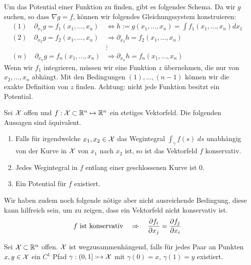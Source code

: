 Um das Potential einer Funktion zu finden, gibt es folgendes Schema. Da wir $g$ suchen, so dass
$\nabla g = f$, können wir folgendes Gleichungssystem konstruieren:
\begin{align*}
  (1) \quad \partial_{x_1} g = f_1(x_1, ... , x_n) &\Longleftrightarrow h := g(x_1, ..., x_n) = \int f_1(x_1, ..., x_n) d x_1 \\
  (2) \quad \partial_{x_2} g = f_2(x_1, ... , x_n) &\Longrightarrow \partial_{x_2} h = f_2(x_1, ... , x_n) \\
  &\vdots \\
  (n) \quad \partial_{x_n} g = f_n(x_1, ... , x_n) &\Longrightarrow \partial_{x_n} h = f_n(x_1, ... , x_n)
\end{align*}
Wenn wir $f_1$ integrieren, müssen wir eine Funktion $z$ übernehmen, die nur von $x_2, ..., x_n$ abhängt. 
Mit den Bedingungen $(1), ..., (n-1)$ können wir die exakte Definition von $z$ finden. Achtung: nicht jede
Funktion besitzt ein Potential.



Sei $\mathcal{X}$ offen und $f: \mathcal{X} \subset \mathbb{R}^n \mapsto \mathbb{R}^n$ ein stetiges Vektorfeld. Die folgenden Aussagen sind äquivalent.
\begin{enumerate}[label=(\arabic*)]
  \item Falls für irgendwelche $x_1, x_2 \in \mathcal{X}$ das Wegintegral $\int_\gamma f(s) \; ds$ unabhängig 
  von der Kurve in $\mathcal{X}$ von $x_1$ nach $x_2$ ist, so ist das Vektorfeld $f$ konservativ.
  \item Jedes Wegintegral in $f$ entlang einer geschlossenen Kurve ist $0$.
  \item Ein Potential für $f$ existiert.
\end{enumerate}

Wir haben zudem noch folgende nötige aber nicht ausreichende Bedingung, diese kann hilfreich sein,
um zu zeigen, dass ein Vektorfeld nicht konservativ ist.
$$f \text{ ist konservativ} \quad \Rightarrow \quad \pdv{f_i}{x_j} = \pdv{f_j}{x_i}$$



Sei $\mathcal{X} \subset \mathbb{R}^n$ offen. $\mathcal{X}$ ist wegzusammenhängend, falls für jedes Paar an Punkten $x, y \in \mathcal{X}$ ein 
$C^1$ Pfad $\gamma: (0, 1]: \mapsto \mathcal{X}$ mit $\gamma(0) = x$, $\gamma(1) = y$ existiert.


\vfill\null
\columnbreak



